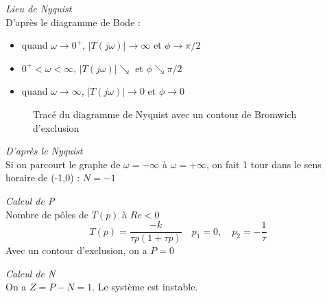 \documentclass[../../Cours_M1.tex]{subfiles}
\begin{document}
\textit{Lieu de Nyquist}\\
D'après le diagramme de Bode :
\begin{itemize}
\item quand $\omega \rightarrow 0^+$, $|T(j\omega)| \rightarrow \infty$ et $\phi \rightarrow \pi/2$
\item $0^+ < \omega < \infty$, $|T(j\omega)| \searrow$ et $\phi \searrow \pi/2$
\item quand $\omega \rightarrow \infty$, $|T(j\omega)| \rightarrow 0$ et $\phi \rightarrow 0$
\end{itemize}


\begin{figure}[h!]
\centering
{}
\caption{Tracé du diagramme de Nyquist avec un contour de Bromwich d'exclusion}
\end{figure}

\textit{D'après le Nyquist} \\
Si on parcourt le graphe de $\omega = -\infty$ à $\omega = +\infty$, on fait 1 tour dans le sens horaire de (-1,0) : $N=-1$

\textit{Calcul de P}\\
Nombre de pôles de $T(p)$ à $Re<0$
\[T(p) = \frac{-k}{\tau p (1+\tau p)}\quad p_1=0, \quad p_2=-\frac{1}{\tau}\]
Avec un contour d'exclusion, on a $P=0$

\textit{Calcul de N}\\
On a $Z=P-N=1$. Le système est instable.
\end{document}
